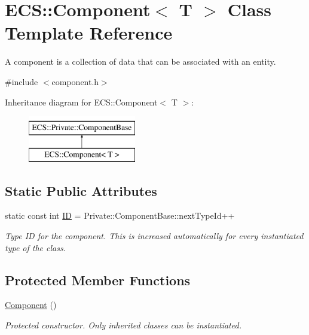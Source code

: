 \hypertarget{class_e_c_s_1_1_component}{\section{E\-C\-S\-:\-:Component$<$ T $>$ Class Template Reference}
\label{class_e_c_s_1_1_component}
}


A component is a collection of data that can be associated with an entity.  




{\ttfamily \#include $<$component.\-h$>$}

Inheritance diagram for E\-C\-S\-:\-:Component$<$ T $>$\-:\begin{figure}[H]
\begin{center}
\leavevmode
\includegraphics[height=2.000000cm]{class_e_c_s_1_1_component}
\end{center}
\end{figure}
\subsection*{Static Public Attributes}
\begin{DoxyCompactItemize}
\item 
\hypertarget{class_e_c_s_1_1_component_a5ffc2d06fe6e84e6bcf14956cae79b79}{static const int \hyperlink{class_e_c_s_1_1_component_a5ffc2d06fe6e84e6bcf14956cae79b79}{I\-D} = Private\-::\-Component\-Base\-::next\-Type\-Id++}\label{class_e_c_s_1_1_component_a5ffc2d06fe6e84e6bcf14956cae79b79}

\begin{DoxyCompactList}\small\item\em Type I\-D for the component. This is increased automatically for every instantiated type of the class. \end{DoxyCompactList}\end{DoxyCompactItemize}
\subsection*{Protected Member Functions}
\begin{DoxyCompactItemize}
\item 
\hypertarget{class_e_c_s_1_1_component_a91e0d98831c5692ba752b1233fd01b24}{\hyperlink{class_e_c_s_1_1_component_a91e0d98831c5692ba752b1233fd01b24}{Component} ()}\label{class_e_c_s_1_1_component_a91e0d98831c5692ba752b1233fd01b24}

\begin{DoxyCompactList}\small\item\em Protected constructor. Only inherited classes can be instantiated. \end{DoxyCompactList}\end{DoxyCompactItemize}


